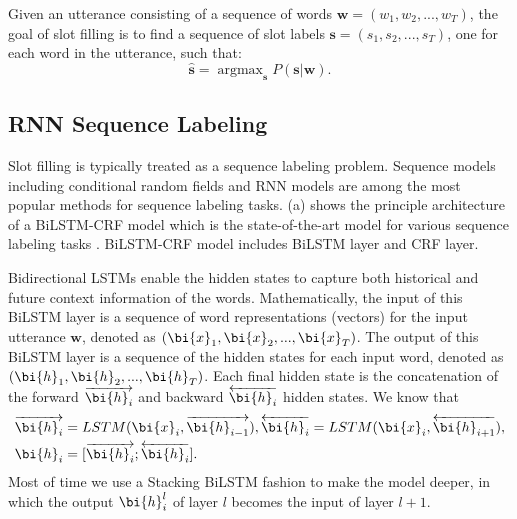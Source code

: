 Given an utterance consisting of a sequence of
words $\textbf{w} = (w_1, w_2, ..., w_T)$,
the goal of slot filling
is to find a sequence of slot labels $\textbf{s} = (s_1, s_2, ..., s_T)$, one for each word in the utterance, such that:
\begin{equation}
	\hat{\textbf{s}} = \mathop{\arg\max}_{\textbf{s}}P(\textbf{s}|\textbf{w}).
\end{equation}

\subsection{RNN Sequence Labeling}
Slot filling is typically treated as a sequence labeling
problem. Sequence models including conditional
random fields \cite{raymond2007generative} and RNN models \cite{yao2014spoken,mesnil2015using} are among
the most popular methods for sequence labeling
tasks. (a) shows the principle architecture of a BiLSTM-CRF model which is
the state-of-the-art model for various sequence labeling tasks \cite{huang2015bidirectional,reimers2017optimal}.
BiLSTM-CRF model includes BiLSTM layer and CRF layer. 


Bidirectional LSTMs enable the
hidden states to capture both historical and future
context information of the words. 
Mathematically, the input of this BiLSTM layer
is a sequence of word representations
(vectors) for the input utterance $\textbf{w}$,
denoted as $(\bi{x}_1, \bi{x}_2, ..., \bi{x}_T)$.
The output of this BiLSTM layer is a sequence of the hidden
states for each input word, denoted
as $(\bi{h}_1, \bi{h}_2, ..., \bi{h}_T)$.
Each final hidden state is the concatenation of the forward
$\overrightarrow{\bi{h}_i}$ and backward $\overleftarrow{\bi{h}_i}$ hidden states. We know that
\begin{eqnarray*}
	& \overrightarrow{\bi{h}_i} = LSTM(\bi{x}_i, \overrightarrow{\bi{h}_{i-1}}),
	 \overleftarrow{\bi{h}_i} = LSTM(\bi{x}_i, \overleftarrow{\bi{h}_{i+1}}), \\
	& \bi{h}_i = [\overrightarrow{\bi{h}_i};\overleftarrow{\bi{h}_i}].
\end{eqnarray*}
Most of time we use a Stacking BiLSTM fashion to make the model deeper,
in which the output $\bi{h}_i^l$ of layer $l$ becomes the input of layer $l+1$.

